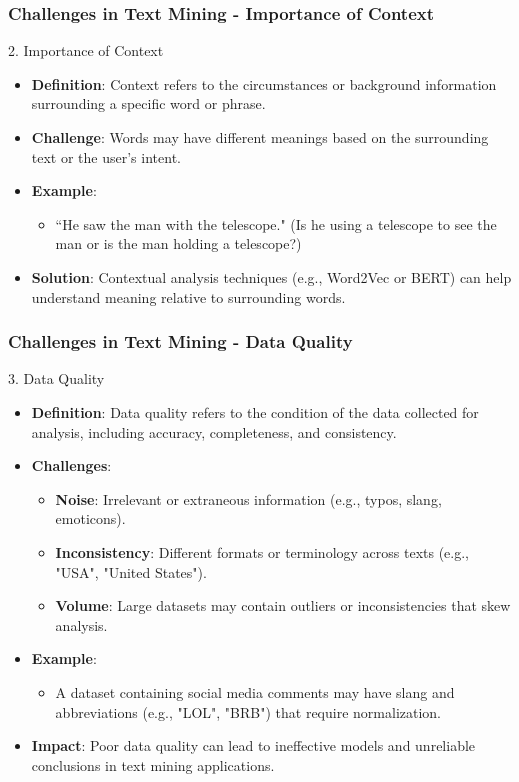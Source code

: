\documentclass[aspectratio=169]{beamer}
\begin{document}
\begin{frame}[fragile]
    \frametitle{Challenges in Text Mining - Importance of Context}
    \begin{block}{2. Importance of Context}
        \begin{itemize}
            \item \textbf{Definition}: Context refers to the circumstances or background information surrounding a specific word or phrase.
            \item \textbf{Challenge}: Words may have different meanings based on the surrounding text or the user's intent.
            \item \textbf{Example}:
            \begin{itemize}
                \item “He saw the man with the telescope." (Is he using a telescope to see the man or is the man holding a telescope?)
            \end{itemize}
            \item \textbf{Solution}: Contextual analysis techniques (e.g., Word2Vec or BERT) can help understand meaning relative to surrounding words.
        \end{itemize}
    \end{block}
\end{frame}

\begin{frame}[fragile]
    \frametitle{Challenges in Text Mining - Data Quality}
    \begin{block}{3. Data Quality}
        \begin{itemize}
            \item \textbf{Definition}: Data quality refers to the condition of the data collected for analysis, including accuracy, completeness, and consistency.
            \item \textbf{Challenges}:
            \begin{itemize}
                \item \textbf{Noise}: Irrelevant or extraneous information (e.g., typos, slang, emoticons).
                \item \textbf{Inconsistency}: Different formats or terminology across texts (e.g., "USA", "United States").
                \item \textbf{Volume}: Large datasets may contain outliers or inconsistencies that skew analysis.
            \end{itemize}
            \item \textbf{Example}:
            \begin{itemize}
                \item A dataset containing social media comments may have slang and abbreviations (e.g., "LOL", "BRB") that require normalization.
            \end{itemize}
            \item \textbf{Impact}: Poor data quality can lead to ineffective models and unreliable conclusions in text mining applications.
        \end{itemize}
    \end{block}
\end{frame}
\end{document}
